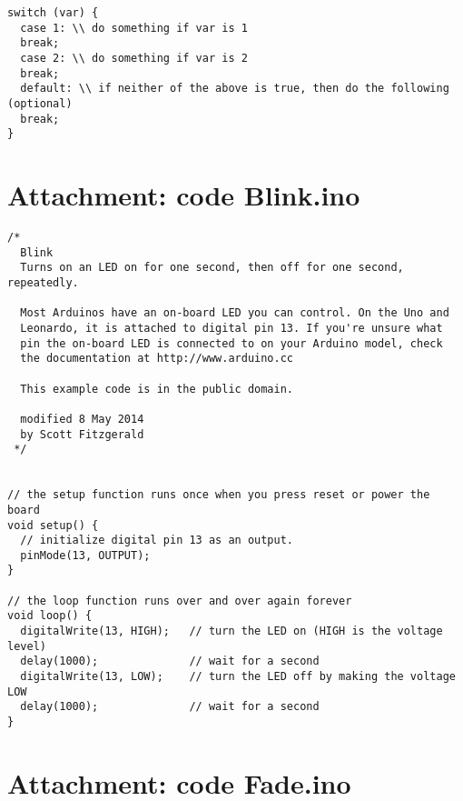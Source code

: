 \documentclass{arduino}
\begin{document}
\begin{lstlisting}
switch (var) {
  case 1: \\ do something if var is 1
  break;
  case 2: \\ do something if var is 2
  break;
  default: \\ if neither of the above is true, then do the following (optional)
  break;
}
\end{lstlisting}

\newpage

\section{Attachment: code Blink.ino}

\begin{minipage}{\widemargin}
\begin{lstlisting}
/*
  Blink
  Turns on an LED on for one second, then off for one second, repeatedly.

  Most Arduinos have an on-board LED you can control. On the Uno and
  Leonardo, it is attached to digital pin 13. If you're unsure what
  pin the on-board LED is connected to on your Arduino model, check
  the documentation at http://www.arduino.cc

  This example code is in the public domain.

  modified 8 May 2014
  by Scott Fitzgerald
 */


// the setup function runs once when you press reset or power the board
void setup() {
  // initialize digital pin 13 as an output.
  pinMode(13, OUTPUT);
}

// the loop function runs over and over again forever
void loop() {
  digitalWrite(13, HIGH);   // turn the LED on (HIGH is the voltage level)
  delay(1000);              // wait for a second
  digitalWrite(13, LOW);    // turn the LED off by making the voltage LOW
  delay(1000);              // wait for a second
}
\end{lstlisting}
\end{minipage}

\newpage

\section{Attachment: code Fade.ino}
\end{document}
